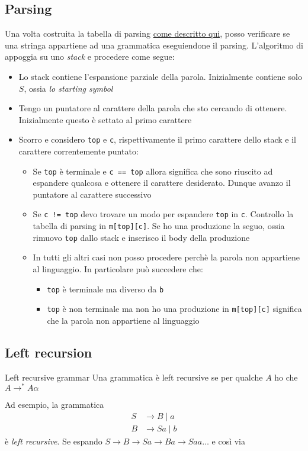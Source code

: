 \subsection{Parsing}\label{parsing}
Una volta costruita la tabella di parsing \hyperref[parsing table]{come descritto qui}, posso verificare se una stringa appartiene ad una grammatica eseguiendone il parsing. L'algoritmo di appoggia su uno \textit{stack} e procedere come segue:
\begin{itemize}
	\item Lo stack contiene l'espansione parziale della parola. Inizialmente contiene solo $ S $, ossia \textit{lo starting symbol}
	\item Tengo un puntatore al carattere della parola che sto cercando di ottenere. Inizialmente questo è settato al primo carattere
	\item Scorro e considero \verb|top| e \verb|c|, rispettivamente il primo carattere dello stack e il carattere correntemente puntato:
	      \begin{itemize}
		      \item Se \verb|top| è terminale e \verb|c == top| allora significa che sono riuscito ad espandere qualcosa e ottenere il carattere desiderato. Dunque avanzo il puntatore al carattere successivo
		      \item Se \verb|c != top| devo trovare un modo per espandere \verb|top| in \verb|c|. Controllo la tabella di parsing in \verb|m[top][c]|. Se ho una produzione la seguo, ossia rimuovo \verb|top| dallo stack e inserisco il body della produzione
		      \item In tutti gli altri casi non posso procedere perchè la parola non appartiene al linguaggio. In particolare può succedere che:
		            \begin{itemize}
			            \item \verb|top| è terminale ma diverso da \verb|b|
			            \item \verb|top| è non terminale ma non ho una produzione in \verb|m[top][c]| significa che la parola non appartiene al linguaggio
		            \end{itemize}
	      \end{itemize}
\end{itemize}
\subsection{Left recursion}
\begin{definizione}{Left recursive grammar}
	Una grammatica è left recursive se per qualche $ A $ ho che $ A \rightarrow^* A \alpha  $
\end{definizione}
Ad esempio, la grammatica
\begin{align*}
	S & \rightarrow B \mid a  \\
	B & \rightarrow Sa \mid b
\end{align*}
è \textit{left recursive}. Se espando $ S \rightarrow B \rightarrow Sa \rightarrow Ba \rightarrow Saa  \ldots  $ e così via


